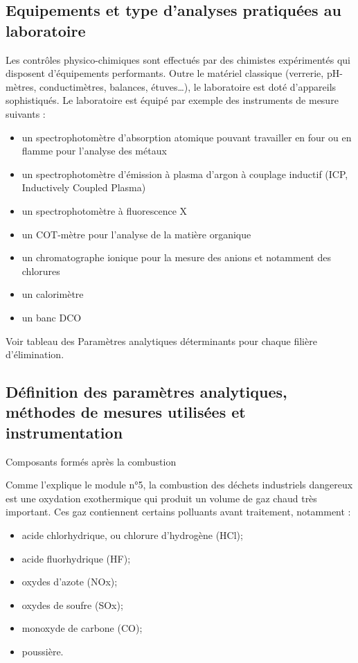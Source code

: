 \subsection{Equipements et type d’analyses pratiquées au laboratoire}

Les contrôles physico-chimiques sont effectués par des chimistes expérimentés qui disposent d’équipements performants.
Outre le matériel classique (verrerie, pH-mètres, conductimètres, balances, étuves…), le laboratoire est doté d’appareils sophistiqués.
Le laboratoire est équipé par exemple des instruments de mesure suivants :

\begin{itemize}
\item un spectrophotomètre d’absorption atomique pouvant travailler en four ou en flamme pour l’analyse des métaux
\item un spectrophotomètre d’émission à plasma d’argon à couplage inductif (ICP, Inductively Coupled Plasma)
\item un spectrophotomètre à fluorescence X
\item un COT-mètre pour l’analyse de la matière organique
\item un chromatographe ionique pour la mesure des anions et notamment des chlorures
\item un calorimètre
\item un banc DCO
\end{itemize}

Voir tableau des Paramètres analytiques déterminants pour chaque filière d’élimination.

\subsection{Définition des paramètres analytiques, méthodes de mesures utilisées et instrumentation}

\vspace{0.3cm}
Composants formés après la combustion
\vspace{0.3cm}

Comme l’explique le module n°5, la combustion des déchets industriels dangereux est une oxydation exothermique qui produit un volume de gaz chaud très important. Ces gaz contiennent certains polluants avant traitement, notamment :

\begin{itemize}
   
\item acide chlorhydrique, ou chlorure d'hydrogène (HCl);
\item acide fluorhydrique (HF);
\item oxydes d'azote (NOx);
\item oxydes de soufre (SOx);
\item monoxyde de carbone (CO);
\item poussière.

\end{itemize}

